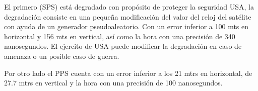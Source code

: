 El primero (SPS) está degradado con propósito de proteger la seguridad USA, la degradación consiste en una pequeña modificación del valor del reloj del satélite con ayuda de un generador pseudoaleatorio. Con un error inferior a 100 mts en horizontal y 156 mts en vertical, así como la hora con una precisión de 340 nanosegundos. El ejercito de USA puede modificar la degradación en caso de amenaza o un posible caso de guerra.

Por otro lado el PPS cuenta con un error inferior a los 21 mtrs en horizontal, de 27.7 mtrs en vertical y la hora con una precisión de 100 nanosegundos.


